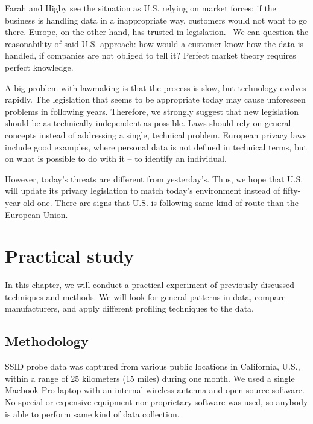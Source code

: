 \documentclass[12pt,a4paper,oneside,pdftex]{report}
\begin{document}
Farah and Higby see the situation as U.S. relying on market forces: if the business is handling data in a inappropriate way, customers would not want to go there. Europe, on the other hand, has trusted in legislation.~\cite{farah2001commerce} We can question the reasonability of said U.S. approach: how would a customer know how the data is handled, if companies are not obliged to tell it? Perfect market theory requires perfect knowledge.

A big problem with lawmaking is that the process is slow, but technology evolves rapidly. The legislation that seems to be appropriate today may cause unforeseen problems in following years. Therefore, we strongly suggest that new legislation should be as technically-independent as possible. Laws should rely on general concepts instead of addressing a single, technical problem. European privacy laws include good examples, where personal data is not defined in technical terms, but on what is possible to do with it -- to identify an individual.

However, today's threats are different from yesterday's. Thus, we hope that U.S. will update its privacy legislation to match today's environment instead of fifty-year-old one. There are signs that U.S. is following same kind of route than the European Union.



\chapter{Practical study}
\label{chapter:practical}

In this chapter, we will conduct a practical experiment of previously discussed techniques and methods. We will look for general patterns in data, compare manufacturers, and apply different profiling techniques to the data. 

\section{Methodology}
\label{sec:methods}

SSID probe data was captured from various public locations in California, U.S., within a range of 25 kilometers (15 miles) during one month. We used a single Macbook Pro laptop with an internal wireless antenna and open-source software. No special or expensive equipment nor proprietary software was used, so anybody is able to perform same kind of data collection.
\end{document}
